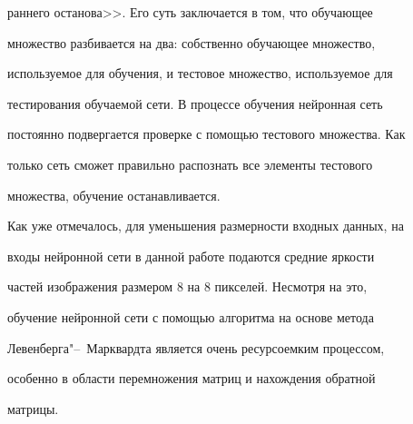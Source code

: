 раннего останова>>. Его суть заключается в том, что обучающее

множество разбивается на два: собственно обучающее множество,

используемое для обучения, и тестовое множество, используемое для

тестирования обучаемой сети. В процессе обучения нейронная сеть

постоянно подвергается проверке с помощью тестового множества. Как

только сеть сможет правильно распознать все элементы тестового

множества, обучение останавливается.



Как уже отмечалось, для уменьшения размерности входных данных, на

входы нейронной сети в данной работе подаются средние яркости

частей изображения размером 8 на 8 пикселей. Несмотря на это,

обучение нейронной сети с помощью алгоритма на основе метода

Левенберга"--~Марквардта является очень ресурсоемким процессом,

особенно в области перемножения матриц и нахождения обратной

матрицы.



